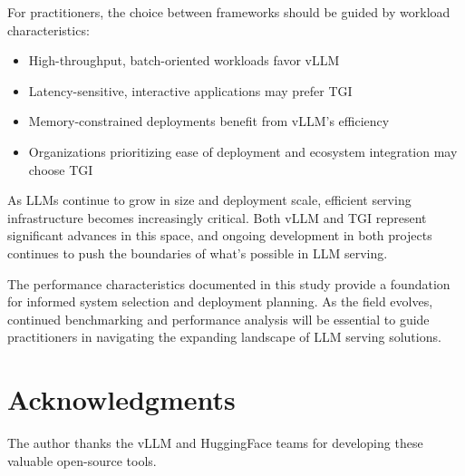 \documentclass{article}
\begin{document}
For practitioners, the choice between frameworks should be guided by workload characteristics:
\begin{itemize}
    \item High-throughput, batch-oriented workloads favor vLLM
    \item Latency-sensitive, interactive applications may prefer TGI
    \item Memory-constrained deployments benefit from vLLM's efficiency
    \item Organizations prioritizing ease of deployment and ecosystem integration may choose TGI
\end{itemize}

As LLMs continue to grow in size and deployment scale, efficient serving infrastructure becomes increasingly critical. Both vLLM and TGI represent significant advances in this space, and ongoing development in both projects continues to push the boundaries of what's possible in LLM serving.

The performance characteristics documented in this study provide a foundation for informed system selection and deployment planning. As the field evolves, continued benchmarking and performance analysis will be essential to guide practitioners in navigating the expanding landscape of LLM serving solutions.

\section*{Acknowledgments}

The author thanks the vLLM and HuggingFace teams for developing these valuable open-source tools.
\end{document}
